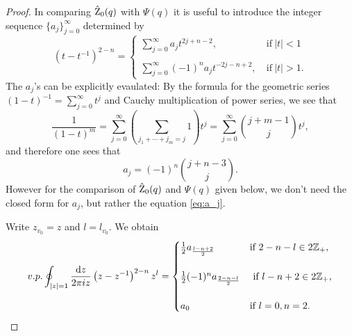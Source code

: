 \begin{proof}
  	In comparing $\hat{\operatorname{Z}}_0(q)$ with $\Psi(q)$ it is useful to introduce the integer sequence $\{a_j\}_{j=0}^{\infty}$ determined by
  	\begin{equation} \label{eq:a_j}
  	\left(t-t^{-1}\right)^{2-n}= \begin{cases} 
  	\sum_{j=0}^{\infty} a_j t^{2j+n-2}, \ & \text{if} \ \lvert t \rvert <1
  	\\ 
  	\\
  	\sum_{j=0}^{\infty} (-1)^n a_j t^{-2j-n+2}, \ & \text{if} \ \lvert t \rvert >1.
  	\end{cases}
  	\end{equation}  
  The $a_j$'s can be explicitly evaulated: By the formula for the geometric series $(1-t)^{-1}= \sum_{j=0}^{\infty} t^j$ and Cauchy multiplication of power  series, we see that
  $$\frac{1}{(1-t)^m}= \sum_{j=0}^{\infty} \left( \sum_{ j_1+\cdots+ j_m=j} 1\right) t^j=  \sum_{j=0}^{\infty} {{j+m-1}\choose{j}}  t^j,$$
  and therefore one sees that
  $$a_j=(-1)^n {{j+n-3}\choose{j}}.$$
  However for the comparison of $\hat{\operatorname{Z}}_0(q)$ and $\Psi(q)$  given below, we don't need the closed form for $a_j$, but rather the equation \eqref{eq:a_j}.
  	
  	Write $z_{v_0}=z$ and $l=l_{v_0}$. We obtain
  	\begin{equation}
  	v.p. \oint_{\lvert z \rvert =1} \frac{\operatorname{{d}\hskip-.6mm} z}{2\pi i z} \left(z-z^{-1}\right)^{2-n} z^{l}= \begin{cases}
  	\frac{1}{2}a_{\frac{l-n+2}{2}} \ & \text{if} \ 2-n-l \in 2 {\mathbb Z}_+,
  	\\
  	\\ \frac{1}{2}(-1)^na_{\frac{2-n-l}{2}} & \ \text{if} \ l-n+2 \in 2{\mathbb Z}_+,
  	\\
  	\\ a_0 \ & \text{if}\  l=0, n= 2.
  	
  	\end{cases}
  	\end{equation}
  	

\end{proof}

